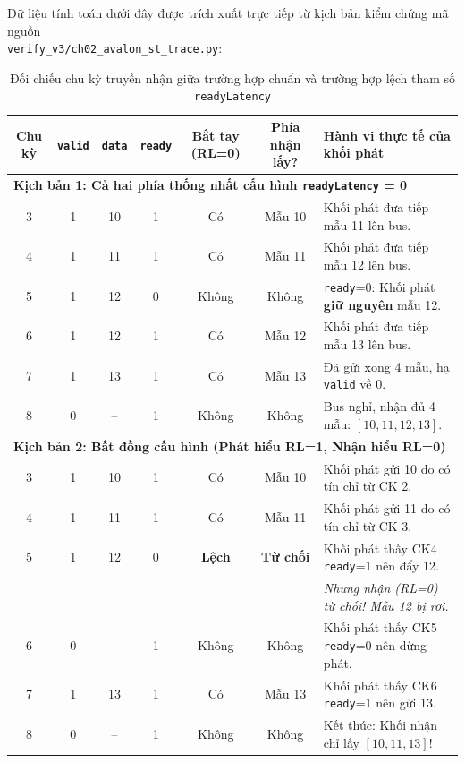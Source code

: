 Dữ liệu tính toán dưới đây được trích xuất trực tiếp từ kịch bản kiểm chứng mã nguồn\\ \texttt{verify\_v3/ch02\_avalon\_st\_trace.py}:

\begin{table}[htbp]
\centering
\footnotesize
\caption{Đối chiếu chu kỳ truyền nhận giữa trường hợp chuẩn và trường hợp lệch tham số \texttt{readyLatency}}
\label{tab:ch02_readylatency_trace}
\begin{tabular}{ccccccl}
\toprule
Chu kỳ & \texttt{valid} & \texttt{data} & \texttt{ready} & Bắt tay (RL=0) & Phía nhận lấy? & Hành vi thực tế của khối phát \\
\midrule
\multicolumn{7}{l}{\textbf{Kịch bản 1: Cả hai phía thống nhất cấu hình \texttt{readyLatency} = 0}} \\
3 & 1 & 10 & 1 & Có & Mẫu 10 & Khối phát đưa tiếp mẫu 11 lên bus. \\
4 & 1 & 11 & 1 & Có & Mẫu 11 & Khối phát đưa tiếp mẫu 12 lên bus. \\
5 & 1 & 12 & 0 & Không & Không & \texttt{ready}=0: Khối phát \textbf{giữ nguyên} mẫu 12. \\
6 & 1 & 12 & 1 & Có & Mẫu 12 & Khối phát đưa tiếp mẫu 13 lên bus. \\
7 & 1 & 13 & 1 & Có & Mẫu 13 & Đã gửi xong 4 mẫu, hạ \texttt{valid} về 0. \\
8 & 0 & -- & 1 & Không & Không & Bus nghỉ, nhận đủ 4 mẫu: $[10, 11, 12, 13]$. \\
\midrule
\multicolumn{7}{l}{\textbf{Kịch bản 2: Bất đồng cấu hình (Phát hiểu RL=1, Nhận hiểu RL=0)}} \\
3 & 1 & 10 & 1 & Có & Mẫu 10 & Khối phát gửi 10 do có tín chỉ từ CK 2. \\
4 & 1 & 11 & 1 & Có & Mẫu 11 & Khối phát gửi 11 do có tín chỉ từ CK 3. \\
5 & 1 & 12 & 0 & \textbf{Lệch} & \textbf{Từ chối} & Khối phát thấy CK4 \texttt{ready}=1 nên đẩy 12. \\
  &   &    &   &        &                & \emph{Nhưng nhận (RL=0) từ chối! Mẫu 12 bị rơi.} \\
6 & 0 & -- & 1 & Không  & Không          & Khối phát thấy CK5 \texttt{ready}=0 nên dừng phát. \\
7 & 1 & 13 & 1 & Có     & Mẫu 13         & Khối phát thấy CK6 \texttt{ready}=1 nên gửi 13. \\
8 & 0 & -- & 1 & Không  & Không          & Kết thúc: Khối nhận chỉ lấy $[10, 11, 13]$! \\
\bottomrule
\end{tabular}
\end{table}

